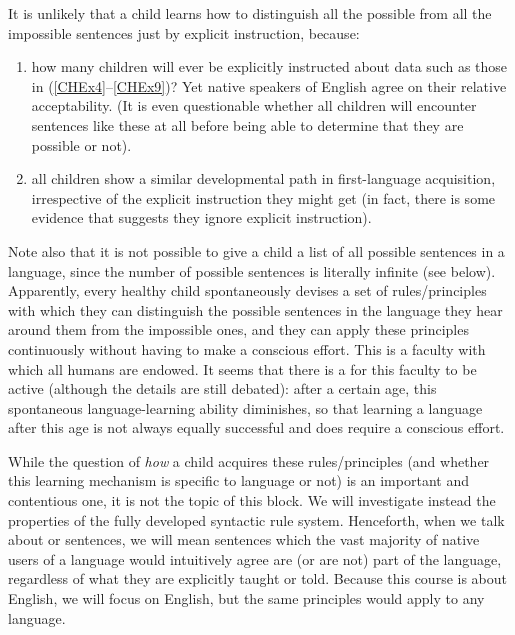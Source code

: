 \documentclass{article}
\begin{document}
It is unlikely that a child learns how to distinguish all the possible from all the impossible sentences just by explicit instruction, because:
\begin{enumerate}
	\item how many children will ever be explicitly instructed about data such as those in (\ref{CHEx4}--\ref{CHEx9})? Yet native speakers of English agree on their relative acceptability. (It is even questionable whether all children will encounter sentences like these at all before being able to determine that they are possible or not).
	\item all children show a similar developmental path in first-language acquisition, irrespective of the explicit instruction they might get (in fact, there is some evidence that suggests they ignore explicit instruction).
\end{enumerate}

Note also that it is not possible to give a child a list of all possible sentences in a language, since the number of possible sentences is literally infinite (see below).
Apparently, every healthy child spontaneously devises a set of rules/principles with which they can distinguish the possible sentences in the language they hear around them from the impossible ones, and they can apply these principles continuously without having to make a conscious effort.
This is a faculty with which all humans are endowed.
It seems that there is a  for this faculty to be active (although the details are still debated): after a certain age, this spontaneous language-learning ability diminishes, so that learning a language after this age is not always equally successful and does require a conscious effort. 

While the question of \emph{how} a child acquires these rules/principles (and whether this learning mechanism is specific to language or not) is an important and contentious one, it is not the topic of this block.
We will investigate instead the properties of the fully developed syntactic rule system.
Henceforth, when we talk about  or  sentences, we will mean sentences which the vast majority of native users of a language would intuitively agree are (or are not) part of the language, regardless of what they are explicitly taught or told. Because this course is about English, we will focus on English, but the same principles would apply to any language.
\end{document}
